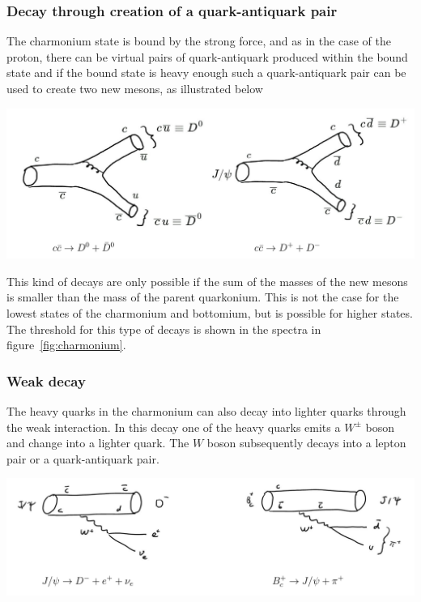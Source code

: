 \documentclass[12pt]{article}
\begin{document}
\subsubsection{Decay through creation of a quark-antiquark pair}
The charmonium state is bound by the strong force, and as in the case of the proton, there can be virtual pairs of quark-antiquark produced within the bound state and if the bound state is heavy enough such a quark-antiquark pair can be used to create two new mesons, as illustrated below  
\begin{center}
\includegraphics[scale=0.2]{images/ccdd.png}
\end{center}
This kind of decays are only possible if the sum of the masses of the new mesons is smaller than the mass of the parent quarkonium. This is not the case for the lowest states of the charmonium and bottomium, but is possible for higher states. The threshold for this type of decays is shown in the spectra in figure~\ref{fig:charmonium}. 
\subsubsection{Weak decay}
The heavy quarks in the charmonium can also decay into lighter quarks through the weak interaction. In this decay one of the heavy quarks emits a $W^\pm$ boson and change into a lighter quark. The $W$ boson subsequently decays into a lepton pair or a quark-antiquark pair. 
\begin{center}
\includegraphics[scale=0.2]{images/jpsiWeak.png}
\end{center}
\end{document}
